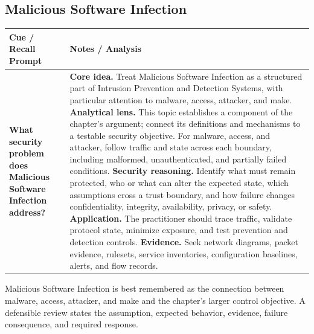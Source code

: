 \documentclass[11pt]{article}
\newcommand{\CornellHeader}{%
\rowcolor{Navy}\color{white}\bfseries Cue / Recall Prompt & \color{white}\bfseries Notes / Analysis\\\hline}
\newcommand{\CornellRow}[2]{%
\cellcolor{CueGray}\RaggedRight\textbf{#1} & \RaggedRight #2\\\hline}
\begin{document}
\subsection*{Malicious Software Infection}
\begin{longtable}{>{\RaggedRight\arraybackslash}p{}|>{\RaggedRight\arraybackslash}p{}}
\CornellHeader
\CornellRow{What security problem does Malicious Software Infection address?}{\textbf{Core idea.} Treat Malicious Software Infection as a structured part of Intrusion Prevention and Detection Systems, with particular attention to malware, access, attacker, and make. \textbf{Analytical lens.} This topic establishes a component of the chapter's argument; connect its definitions and mechanisms to a testable security objective. For malware, access, and attacker, follow traffic and state across each boundary, including malformed, unauthenticated, and partially failed conditions. \textbf{Security reasoning.} Identify what must remain protected, who or what can alter the expected state, which assumptions cross a trust boundary, and how failure changes confidentiality, integrity, availability, privacy, or safety. \textbf{Application.} The practitioner should trace traffic, validate protocol state, minimize exposure, and test prevention and detection controls. \textbf{Evidence.} Seek network diagrams, packet evidence, rulesets, service inventories, configuration baselines, alerts, and flow records.}
\end{longtable}
\begin{topicsummary}
Malicious Software Infection is best remembered as the connection between malware, access, attacker, and make and the chapter's larger control objective. A defensible review states the assumption, expected behavior, evidence, failure consequence, and required response.
\end{topicsummary}
\end{document}

